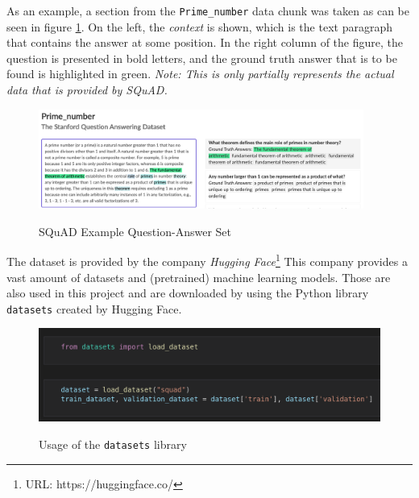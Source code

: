             As an example, a section from the \texttt{Prime\_number} data chunk was taken as can be seen in figure \ref{fig:-squad-example}. On the left, the \emph{context} is shown, which is the text paragraph that contains the answer at some position.
            In the right column of the figure, the question is presented in bold letters, and the ground truth answer that is to be found is highlighted in green. \emph{Note: This is only partially represents the actual data that is provided by SQuAD.}

            \begin{figure}[h!]
                \centering
                \caption{SQuAD Example Question-Answer Set\cite{squadExample}}
                \includegraphics[width=0.95\textwidth]{figures/squad_example.png}
                \label{fig:-squad-example}
            \end{figure}

            The dataset is provided by the company \emph{Hugging Face}\footnote{URL: https://huggingface.co/}
            This company provides a vast amount of datasets and (pretrained) machine learning models. 
            Those are also used in this project and are downloaded by using the Python library \texttt{datasets} created by Hugging Face.

            \begin{figure}
                \centering
                \caption{Usage of the \texttt{datasets} library}
                \includegraphics[scale=0.8]{figures/datasets_library.png}
                \label{fig:-datasets-library}
            \end{figure}

